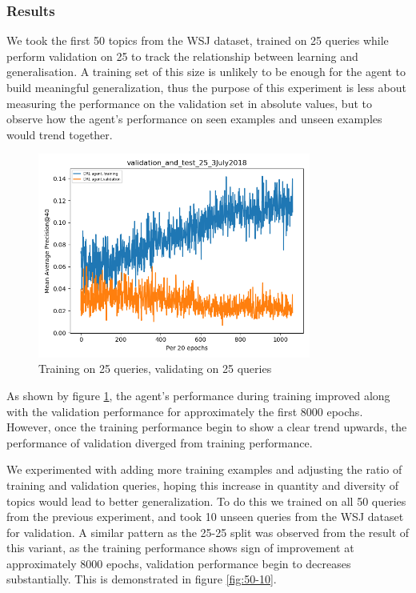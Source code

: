 \subsubsection{Results}

We took the first 50 topics from the WSJ dataset, trained on 25 queries while perform validation on 25 to track the relationship between learning and generalisation. A training set of this size is unlikely to be enough for the agent to build meaningful generalization, thus the purpose of this experiment is less about measuring the performance on the validation set in absolute values, but to observe how the agent's performance on seen examples and unseen examples would trend together. 


\begin{figure}[H]
	\centering
	\includegraphics[width=0.8\textwidth]{images/25-25}
	\caption{Training on 25 queries, validating on 25 queries}
	\label{fig:25-25}
\end{figure}


As shown by figure \ref{fig:25-25}, the agent's performance during training improved along with the validation performance for approximately the first 8000 epochs. However, once the training performance begin to show a clear trend upwards, the performance of validation diverged from training performance.  

We experimented with adding more training examples and adjusting the ratio of training and validation queries, hoping this increase in quantity and diversity of topics would lead to better generalization.  To do this we trained on all 50 queries from the previous experiment, and took 10 unseen queries from the WSJ dataset for validation. A similar pattern as the 25-25 split was observed from the result of this variant, as the training performance shows sign of improvement at approximately 8000 epochs, validation performance begin to decreases substantially. This is demonstrated in figure \ref{fig:50-10}.

